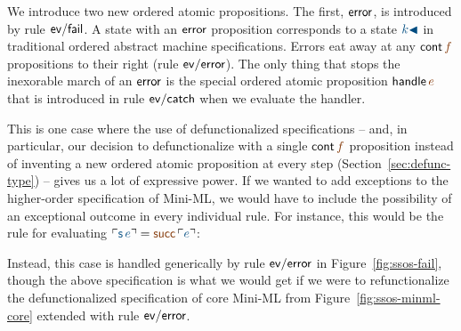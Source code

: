 We introduce two new ordered atomic propositions. The first, ${\sf
  error}$, is introduced by rule ${\sf ev/fail}$.
 A state with an ${\sf error}$
proposition corresponds to a state $\obj{k{\blacktriangleleft}}$ in
traditional ordered abstract machine specifications. Errors eat away
at any ${\sf cont}\,\lf{f}$ propositions to their right (rule ${\sf
  ev/error}$). The only thing that stops the inexorable march of an
${\sf error}$ is the special ordered atomic proposition ${\sf
  handle}\,\lf{e}$ that is introduced in rule ${\sf ev/catch}$ when we
evaluate the handler.

This is one case where the use of defunctionalized specifications --
and, in particular, our decision to defunctionalize with a single
${\sf cont}\,\lf{f}$ proposition instead of inventing a new ordered atomic
proposition at every step (Section~\ref{sec:defunc-type}) -- 
gives us a lot of expressive power. If we
wanted to add exceptions to the higher-order specification of Mini-ML,
we would have to include the possibility of an exceptional outcome in
every individual rule. For instance, this would be the 
rule for evaluating $\interp{{\sf s}\,e} = \lf{{\sf succ}\,\interp{e}}$:

\smallskip
{}
\smallskip

\noindent
Instead, this case is handled generically by rule ${\sf ev/error}$ in
Figure~\ref{fig:ssos-fail}, though the above specification is what we
would get if we were to refunctionalize the defunctionalized
specification of core Mini-ML from Figure~\ref{fig:ssos-minml-core}
extended with rule ${\sf ev/error}$.



